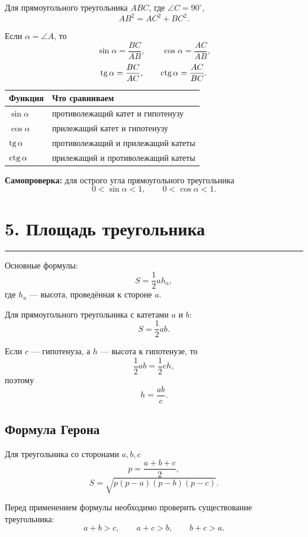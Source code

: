 \documentclass[a4paper,12pt]{article}
\providecommand{\tg}{\mathop{\rm tg}\nolimits}
\providecommand{\ctg}{\mathop{\rm ctg}\nolimits}
\newcommand{\key}[1]{\textcolor{darkaccent}{\textbf{#1}}}
\newcommand{\sectionrule}{%
  \par\vspace{-0.35em}%
  {\color{accent!60}\rule{\linewidth}{0.7pt}}%
  \vspace{0.35em}
}
\begin{document}
Для прямоугольного треугольника \(ABC\), где
\(\angle C=90^\circ\),
\[
\boxed{AB^2=AC^2+BC^2}.
\]

Если \(\alpha=\angle A\), то
\[
\sin\alpha=\frac{BC}{AB},
\qquad
\cos\alpha=\frac{AC}{AB},
\]
\[
\tg\alpha=\frac{BC}{AC},
\qquad
\ctg\alpha=\frac{AC}{BC}.
\]

\begin{center}
\renewcommand{\arraystretch}{1.3}
\begin{tabularx}{0.88\linewidth}{@{}lX@{}}
\toprule
\textbf{Функция} & \textbf{Что сравниваем} \\
\midrule
\(\sin\alpha\) &
противолежащий катет и гипотенузу \\

\(\cos\alpha\) &
прилежащий катет и гипотенузу \\

\(\tg\alpha\) &
противолежащий и прилежащий катеты \\

\(\ctg\alpha\) &
прилежащий и противолежащий катеты \\
\bottomrule
\end{tabularx}
\end{center}

\key{Самопроверка:}
для острого угла прямоугольного треугольника
\[
0<\sin\alpha<1,
\qquad
0<\cos\alpha<1.
\]

\section*{\textcolor{darkaccent}{5. Площадь треугольника}}
\sectionrule

Основные формулы:
\[
\boxed{S=\frac12 ah_a},
\]
где \(h_a\) --- высота, проведённая к стороне \(a\).

Для прямоугольного треугольника с катетами \(a\) и \(b\):
\[
\boxed{S=\frac12 ab}.
\]

Если \(c\) --- гипотенуза, а \(h\) --- высота к гипотенузе, то
\[
\frac12 ab=\frac12 ch,
\]
поэтому
\[
\boxed{h=\frac{ab}{c}}.
\]

\subsection*{\textcolor{accent}{Формула Герона}}

Для треугольника со сторонами \(a,b,c\)
\[
p=\frac{a+b+c}{2},
\]
\[
\boxed{
S=\sqrt{p(p-a)(p-b)(p-c)}
}.
\]

Перед применением формулы необходимо проверить существование треугольника:
\[
a+b>c,\qquad
a+c>b,\qquad
b+c>a.
\]
\end{document}
